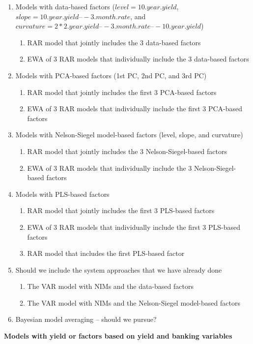 \documentclass[11pt]{article}
\begin{document}
\begin{enumerate}
\item Models with data-based factors ($level=10.year.yield$, $slope=10.year.yield–-3.month.rate$, and $curvature=2*2.year.yield–-3.month.rate–-10.year.yield$)
\begin{enumerate}
\item RAR model that jointly includes the 3 data-based factors
\item EWA of 3 RAR models that individually include the 3 data-based factors
\end{enumerate}
\item Models with PCA-based factors (1st PC, 2nd PC, and 3rd PC)
\begin{enumerate}
\item RAR model that jointly includes the first 3 PCA-based factors
\item EWA of 3 RAR models that individually include the first 3 PCA-based factors
\end{enumerate}
\item Models with Nelson-Siegel model-based factors (level, slope, and curvature)
\begin{enumerate}
\item RAR model that jointly includes the 3 Nelson-Siegel-based factors
\item EWA of 3 RAR models that individually include the 3 Nelson-Siegel-based factors
\end{enumerate}
\item Models with PLS-based factors
\begin{enumerate}
\item RAR model that jointly includes the first 3 PLS-based factors
\item EWA of 3 RAR models that individually include the first 3 PLS-based factors
\item RAR model that includes the first PLS-based factor
\end{enumerate}
\item Should we include the system approaches that we have already done
\begin{enumerate}
\item The VAR model with NIMs and the data-based factors
\item The VAR model with NIMs and the Nelson-Siegel model-based factors
\end{enumerate}
\item Bayesian model averaging – should we pursue?
\end{enumerate}

\textbf{Models with yield or factors based on yield and banking variables}
\end{document}
